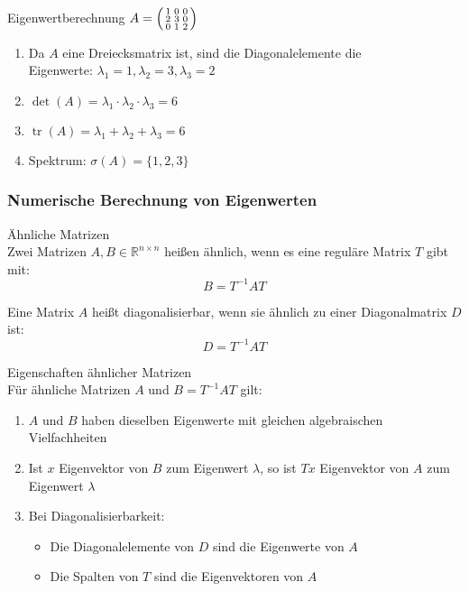 \begin{example2}{Eigenwertberechnung}
$A = \begin{psmallmatrix} 1 & 0 & 0\\ 2 & 3 & 0\\ 0 & 1 & 2\end{psmallmatrix}$
\begin{enumerate}
    \item Da $A$ eine Dreiecksmatrix ist, sind die Diagonalelemente die \\
    Eigenwerte:
    $\lambda_1 = 1, \lambda_2 = 3, \lambda_3 = 2$
    \item $\det(A) = \lambda_1\cdot\lambda_2\cdot\lambda_3 = 6$
    \item $\operatorname{tr}(A) = \lambda_1 + \lambda_2 + \lambda_3 = 6$
    \item Spektrum: $\sigma(A) = \{1,2,3\}$
\end{enumerate}
\end{example2}



\subsubsection{Numerische Berechnung von Eigenwerten}

\begin{concept}{Ähnliche Matrizen}\\
Zwei Matrizen $A,B \in \mathbb{R}^{n\times n}$ heißen ähnlich, wenn es eine reguläre Matrix $T$ gibt mit:
$$B = T^{-1}AT$$

Eine Matrix $A$ heißt diagonalisierbar, wenn sie ähnlich zu einer Diagonalmatrix $D$ ist:
$$D = T^{-1}AT$$
\end{concept}

\begin{theorem}{Eigenschaften ähnlicher Matrizen}\\
Für ähnliche Matrizen $A$ und $B = T^{-1}AT$ gilt:
\begin{enumerate}
    \item $A$ und $B$ haben dieselben Eigenwerte mit gleichen algebraischen Vielfachheiten
    \item Ist $x$ Eigenvektor von $B$ zum Eigenwert $\lambda$, so ist $Tx$ Eigenvektor von $A$ zum Eigenwert $\lambda$
    \item Bei Diagonalisierbarkeit:
    \begin{itemize}
        \item Die Diagonalelemente von $D$ sind die Eigenwerte von $A$
        \item Die Spalten von $T$ sind die Eigenvektoren von $A$
    \end{itemize}
\end{enumerate}
\end{theorem}

